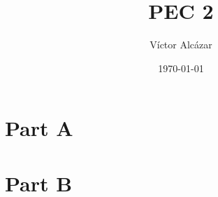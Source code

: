
\author{Víctor Alcázar}
\title{PEC 2}
\date{\today}

\maketitle

\section{Part A}












\section{Part B}











